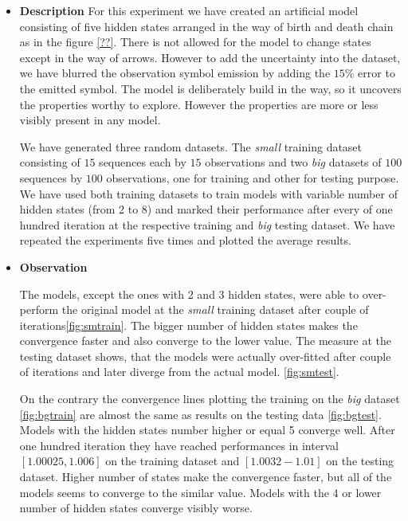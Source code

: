 \documentclass[thesis=M,english]{FITthesis}[2012/10/20]
\begin{document}
\begin{itemize}
\item \textbf{ Description }
For this experiment we have created an artificial model consisting of five hidden states arranged in the way of birth and death chain as in the figure \ref{??}. There is not allowed for the model to change states except in the way of arrows. However to add the uncertainty into the dataset, we have blurred the observation symbol emission by adding the $15\%$ error to the emitted symbol. The model is deliberately build in the way, so it uncovers the properties worthy to explore. However the properties are more or less visibly present in any model. 

 
We have generated three random datasets. The \textit{small} training dataset consisting of $15$ sequences each by $15$ observations and two \textit{big} datasets of $100$ sequences by $100$ observations, one for training and other for testing purpose. We have used both training datasets to train models with variable number of hidden states (from 2 to 8) and marked their performance after every of one hundred iteration at the respective training and \textit{big} testing dataset. We have repeated the experiments five times and plotted the average results.   

\item \textbf{ Observation }

The models, except the ones with 2 and 3 hidden states, were able to over-perform the original model at the \textit{small} training dataset after couple of iterations\ref{fig:smtrain}. The bigger number of hidden states makes the convergence faster and also converge to the lower value. The measure at the testing dataset shows, that the models were actually over-fitted after couple of iterations and later diverge from the actual model. \ref{fig:smtest}. 

On the contrary the convergence lines plotting the training on the \textit{big} dataset \ref{fig:bgtrain} are almost the same as results on the testing data \ref{fig:bgtest}. Models with the hidden states number higher or equal 5 converge well. After one hundred iteration they have reached performances in interval $[1.00025,1.006]$ on the training dataset and $[1.0032-1.01]$ on the testing dataset. Higher number of states make the convergence faster, but all of the models seems to converge to the similar value. Models with the 4 or lower number of hidden states converge visibly worse. 


\end{itemize}
\end{document}
